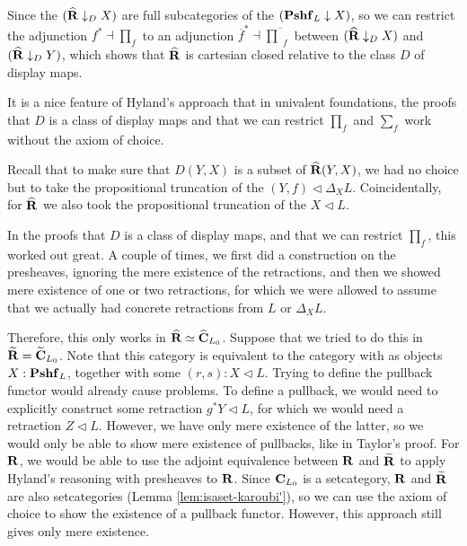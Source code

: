 \begin{corollary}\label{cor:relatively-cartesian-closed}
  Since the $ (\widehat {\mathbf{R}} \downarrow_D X) $ are full subcategories of the $ (\mathbf{Pshf}_{L} \downarrow X) $, so we can restrict the adjunction $ f^* \dashv \prod_f $ to an adjunction $ \overline f^* \dashv \overline \prod_f $ between $ (\widehat {\mathbf{R}} \downarrow_D X) $ and $ (\widehat {\mathbf{R}} \downarrow_D Y) $, which shows that $ \widehat {\mathbf{R}} $ is cartesian closed relative to the class $ D $ of display maps.
\end{corollary}

\begin{remark}
  It is a nice feature of Hyland's approach that in univalent foundations, the proofs that $ D $ is a class of display maps and that we can restrict $ \prod_f $ and $ \sum_f $ work without the axiom of choice.
\end{remark}

\begin{remark}\label{rem:difference-Taylor-Hyland}
  Recall that to make sure that $ D(Y, X) $ is a subset of $ \widehat {\mathbf{R}}(Y, X) $, we had no choice but to take the propositional truncation of the $ (Y, f) \triangleleft \Delta_X L $. Coincidentally, for $ \widehat {\mathbf{R}} $ we also took the propositional truncation of the $ X \triangleleft L $.

  In the proofs that $ D $ is a class of display maps, and that we can restrict $ \prod_f $, this worked out great. A couple of times, we first did a construction on the presheaves, ignoring the mere existence of the retractions, and then we showed mere existence of one or two retractions, for which we were allowed to assume that we actually had concrete retractions from $ L $ or $ \Delta_X L $.

  Therefore, this only works in $ \widehat {\mathbf{R}} \simeq \widehat {\mathbf{C}}_{L_0} $. Suppose that we tried to do this in $ \widetilde {\mathbf{R}} = \widetilde {\mathbf{C}}_{L_0} $. Note that this category is equivalent to the category with as objects $ X : \mathbf{Pshf}_{L} $, together with some $ (r, s) : X \triangleleft L $. Trying to define the pullback functor would already cause problems. To define a pullback, we would need to explicitly construct some retraction $ g^* Y \triangleleft L $, for which we would need a retraction $ Z \triangleleft L $. However, we have only mere existence of the latter, so we would only be able to show mere existence of pullbacks, like in Taylor's proof. For $ \mathbf{R} $, we would be able to use the adjoint equivalence between $ \mathbf{R} $ and $ \widetilde {\mathbf{R}} $ to apply Hyland's reasoning with presheaves to $ \mathbf{R} $. Since $ \mathbf{C}_{L_0} $ is a setcategory, $ \mathbf{R} $ and $ \widetilde {\mathbf{R}} $ are also setcategories (Lemma \ref{lem:isaset-karoubi'}), so we can use the axiom of choice to show the existence of a pullback functor. However, this approach still gives only mere existence.
\end{remark}

